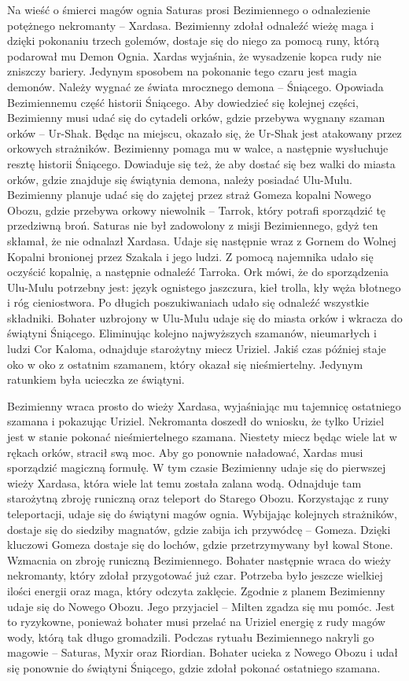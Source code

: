 \documentclass[11pt,polish, openany]{book}
\begin{document}
Na wieść o śmierci magów ognia Saturas prosi Bezimiennego o odnalezienie potężnego nekromanty – Xardasa. Bezimienny zdołał odnaleźć wieżę maga i dzięki pokonaniu trzech golemów, dostaje się do niego za pomocą runy, którą podarował mu Demon Ognia. Xardas wyjaśnia, że wysadzenie kopca rudy nie zniszczy bariery. Jedynym sposobem na pokonanie tego czaru jest magia demonów. Należy wygnać ze świata mrocznego demona – Śniącego. Opowiada Bezimiennemu część historii Śniącego. Aby dowiedzieć się kolejnej części, Bezimienny musi udać się do cytadeli orków, gdzie przebywa wygnany szaman orków – Ur-Shak. Będąc na miejscu, okazało się, że Ur-Shak jest atakowany przez orkowych strażników. Bezimienny pomaga mu w walce, a następnie wysłuchuje resztę historii Śniącego. Dowiaduje się też, że aby dostać się bez walki do miasta orków, gdzie znajduje się świątynia demona, należy posiadać Ulu-Mulu. Bezimienny planuje udać się do zajętej przez straż Gomeza kopalni Nowego Obozu, gdzie przebywa orkowy niewolnik – Tarrok, który potrafi sporządzić tę przedziwną broń. Saturas nie był zadowolony z misji Bezimiennego, gdyż ten skłamał, że nie odnalazł Xardasa. Udaje się następnie wraz z Gornem do Wolnej Kopalni bronionej przez Szakala i jego ludzi. Z pomocą najemnika udało się oczyścić kopalnię, a następnie odnaleźć Tarroka. Ork mówi, że do sporządzenia Ulu-Mulu potrzebny jest: język ognistego jaszczura, kieł trolla, kły węża błotnego i róg cieniostwora. Po długich poszukiwaniach udało się odnaleźć wszystkie składniki. Bohater uzbrojony w Ulu-Mulu udaje się do miasta orków i wkracza do świątyni Śniącego. Eliminując kolejno najwyższych szamanów, nieumarłych i ludzi Cor Kaloma, odnajduje starożytny miecz Uriziel. Jakiś czas później staje oko w oko z ostatnim szamanem, który okazał się nieśmiertelny. Jedynym ratunkiem była ucieczka ze świątyni.

Bezimienny wraca prosto do wieży Xardasa, wyjaśniając mu tajemnicę ostatniego szamana i pokazując Uriziel. Nekromanta doszedł do wniosku, że tylko Uriziel jest w stanie pokonać nieśmiertelnego szamana. Niestety miecz będąc wiele lat w rękach orków, stracił swą moc. Aby go ponownie naładować, Xardas musi sporządzić magiczną formułę. W tym czasie Bezimienny udaje się do pierwszej wieży Xardasa, która wiele lat temu została zalana wodą. Odnajduje tam starożytną zbroję runiczną oraz teleport do Starego Obozu. Korzystając z runy teleportacji, udaje się do świątyni magów ognia. Wybijając kolejnych strażników, dostaje się do siedziby magnatów, gdzie zabija ich przywódcę – Gomeza. Dzięki kluczowi Gomeza dostaje się do lochów, gdzie przetrzymywany był kowal Stone. Wzmacnia on zbroję runiczną Bezimiennego. Bohater następnie wraca do wieży nekromanty, który zdołał przygotować już czar. Potrzeba było jeszcze wielkiej ilości energii oraz maga, który odczyta zaklęcie. Zgodnie z planem Bezimienny udaje się do Nowego Obozu. Jego przyjaciel – Milten zgadza się mu pomóc. Jest to ryzykowne, ponieważ bohater musi przelać na Uriziel energię z rudy magów wody, którą tak długo gromadzili. Podczas rytuału Bezimiennego nakryli go magowie – Saturas, Myxir oraz Riordian. Bohater ucieka z Nowego Obozu i udał się ponownie do świątyni Śniącego, gdzie zdołał pokonać ostatniego szamana.
\end{document}
